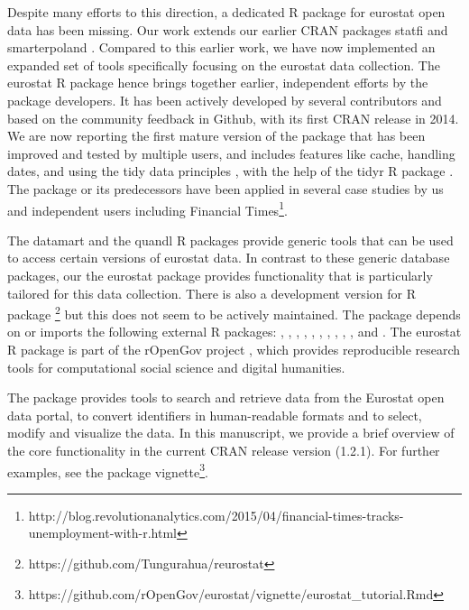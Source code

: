 Despite many efforts to this direction, a dedicated R package for
eurostat open data has been missing. Our work extends our earlier CRAN
packages statfi \citep{statfi} and smarterpoland
\citep{smarterpoland}. Compared to this earlier work, we have now
implemented an expanded set of tools specifically focusing on the
eurostat data collection. The eurostat R package hence brings together
earlier, independent efforts by the package developers. It has been
actively developed by several contributors and based on the community
feedback in Github, with its first CRAN release in 2014. We are now
reporting the first mature version of the package that has been
improved and tested by multiple users, and includes features like
cache, handling dates, and using the tidy data
principles \citep{wickham2014}, with the help of the tidyr R
package \citep{tidyr}. The package or its predecessors have been
applied in several case studies by us and independent users including
Financial
Times\footnote{http://blog.revolutionanalytics.com/2015/04/financial-times-tracks-unemployment-with-r.html}.

The datamart \citep{datamart} and the quandl
\citep{quandl} R packages provide generic tools that can be used to access
certain versions of eurostat data. In contrast to these generic
database packages, our the eurostat package provides functionality
that is particularly tailored for this data collection. There is also
a development version for R package
\footnote{https://github.com/Tungurahua/reurostat} but this
does not seem to be actively maintained. The package
depends on or imports the following external R packages:
 \citep{devtools},  \citep{dplyr},
 \citep{knitr},  \citep{ggplot2},
 \citep{mapproj},  \citep{plotrix},
 \citep{reshape2}, 
\citep{rmarkdown},  \citep{stringi},
 \citep{testthat}, and 
\citep{tidyr}. The eurostat R package is
part of the rOpenGov project
\citep{Lahti13icml}, which provides reproducible research tools for
computational social science and digital humanities.


The package provides tools to search and retrieve data from the
Eurostat open data portal, to convert identifiers in human-readable
formats and to select, modify and visualize the data. In this
manuscript, we provide a brief overview of the core functionality in
the current CRAN release version (1.2.1). For further examples, see
the package
vignette\footnote{https://github.com/rOpenGov/eurostat/vignette/eurostat\_tutorial.Rmd}.



